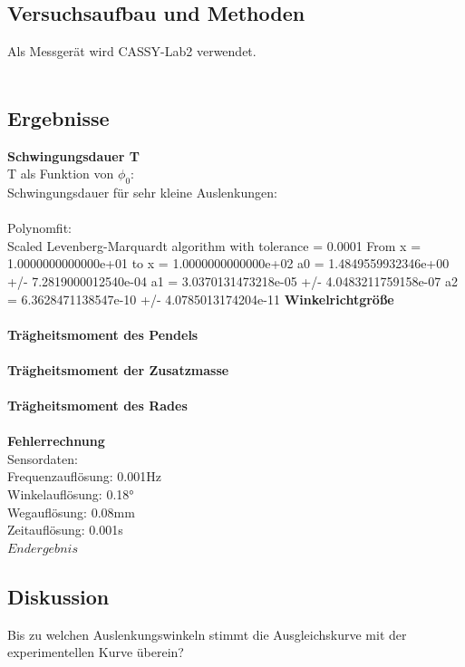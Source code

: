 \documentclass{article}
\begin{document}
\subsection{Versuchsaufbau und Methoden}
Als Messgerät wird CASSY-Lab2 verwendet.\\
\\
\subsection{Ergebnisse}
\textbf{Schwingungsdauer T}\\
T als Funktion von $\phi_0$: \\
Schwingungsdauer für sehr kleine Auslenkungen:\\
\\
Polynomfit:\\
Scaled Levenberg-Marquardt algorithm with tolerance = 0.0001
From x = 1.0000000000000e+01 to x = 1.0000000000000e+02
a0 = 1.4849559932346e+00 +/- 7.2819000012540e-04
a1 = 3.0370131473218e-05 +/- 4.0483211759158e-07
a2 = 6.3628471138547e-10 +/- 4.0785013174204e-11
\textbf{Winkelrichtgröße}\\
\\
\textbf{Trägheitsmoment des Pendels}\\
\\
\textbf{Trägheitsmoment der Zusatzmasse}\\
\\
\textbf{Trägheitsmoment des Rades}\\
\\
\textbf{Fehlerrechnung}\\
Sensordaten:\\
Frequenzauflösung: 0.001Hz\\
Winkelauflösung: 0.18°\\
Wegauflösung: 0.08mm\\
Zeitauflösung: 0.001s\\
$\boxed{Endergebnis}$ %
\subsection{Diskussion}
Bis zu welchen Auslenkungswinkeln stimmt die Ausgleichskurve mit der experimentellen Kurve überein? 
\end{document}
